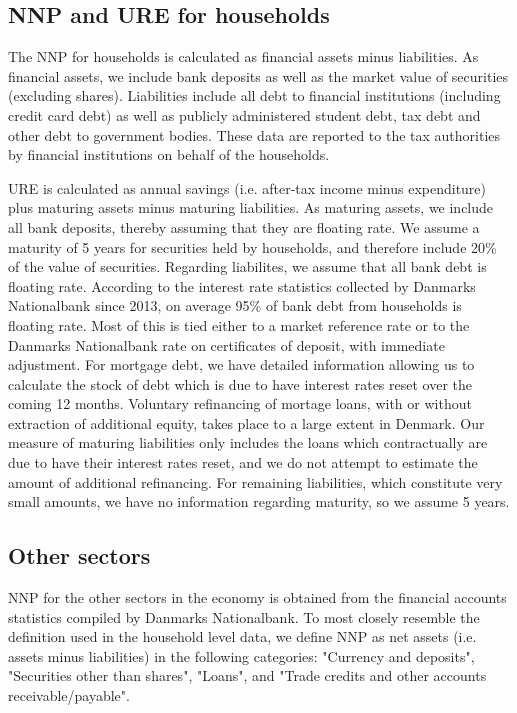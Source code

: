 \documentclass[titlepage]{\econtex}\newcommand{\texname}{ConsumptionHeterogeneity}
\begin{document}
\subsection{NNP and URE for households}
The NNP for households is calculated as financial assets minus liabilities. As financial assets, we include bank deposits as well as the market value of securities (excluding shares). Liabilities include all debt to financial institutions (including credit card debt) as well as publicly administered student debt, tax debt and other debt to government bodies. These data are reported to the tax authorities by financial institutions on behalf of the households. 

URE is calculated as annual savings (i.e. after-tax income minus expenditure) plus maturing assets minus maturing liabilities. As maturing assets, we include all bank deposits, thereby assuming that they are floating rate. We assume a maturity of 5 years for securities held by households, and therefore include 20\% of the value of securities. Regarding liabilites, we assume that all bank debt is floating rate. According to the interest rate statistics collected by Danmarks Nationalbank since 2013, on average 95\% of bank debt from households is floating rate. Most of this is tied either to a market reference rate or to the Danmarks Nationalbank rate on certificates of deposit, with immediate adjustment. For mortgage debt, we have detailed information allowing us to calculate the stock of debt which is due to have interest rates reset over the coming 12 months. Voluntary refinancing of mortage loans, with or without extraction of additional equity, takes place to a large extent in Denmark. Our measure of maturing liabilities only includes the loans which contractually are due to have their interest rates reset, and we do not attempt to estimate the amount of additional refinancing. For remaining liabilities, which constitute very small amounts, we have no information regarding maturity, so we assume 5 years. 

\subsection{Other sectors}
NNP for the other sectors in the economy is obtained from the financial accounts statistics compiled by Danmarks Nationalbank. To most closely resemble the definition used in the household level data, we define NNP as net assets (i.e. assets minus liabilities) in the following categories: "Currency and deposits", "Securities other than shares", "Loans", and "Trade credits and other accounts receivable/payable". 
\end{document}
